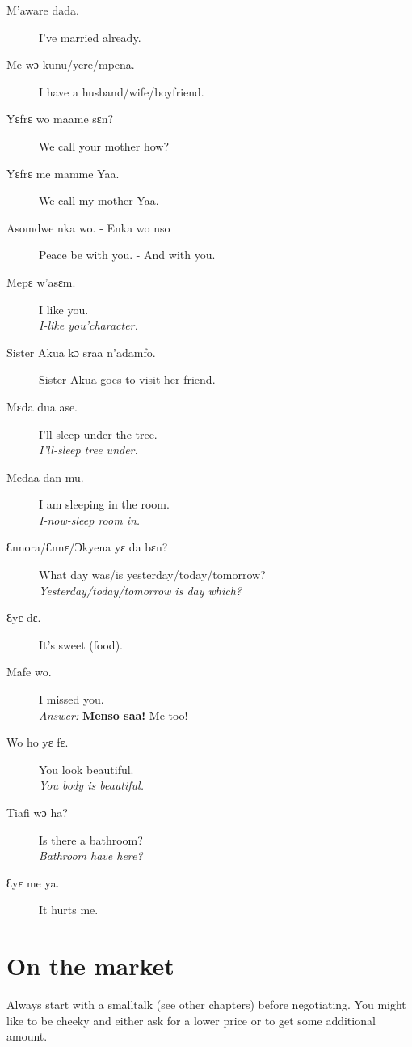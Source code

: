 \documentclass[%
 fontsize=11pt,%
 a5paper,pagesize,
 paper=a5,%
 DIV=9,%
 parskip=half*,%
 twoside=true,
 pointlessnumbers
]{scrbook}%
\begin{document}
\begin{description}
  \item[M'aware dada.] I've married already.
  \item[Me wɔ kunu/yere/mpena.] I have a husband/wife/boyfriend.
  \item[Yɛfrɛ wo maame sɛn?] We call your mother how?
  \item[Yɛfrɛ me mamme Yaa.] We call my mother Yaa.
  \item[Asomdwe nka wo. - Enka wo nso] Peace be with you. - And with you.
  \item[Mepɛ w'asɛm.] I like you. \\
    \textit{I-like you'character.}
  \item[Sister Akua kɔ sraa n'adamfo.] Sister Akua goes to visit her friend.
  \item[Mɛda dua ase.] I'll sleep under the tree. \\
    \textit{I'll-sleep tree under.}
  \item[Medaa dan mu.] I am sleeping in the room. \\
    \textit{I-now-sleep room in.}
  \item[Ɛnnora/Ɛnnɛ/Ɔkyena yɛ da bɛn?] What day was/is yesterday/today/tomorrow? \\
    \textit{Yesterday/today/tomorrow is day which?}
  \item[Ɛyɛ dɛ.] It's sweet (food).
  \item[Mafe wo.] I missed you. \\
    \textit{Answer:} \textbf{Menso saa!} Me too!
  \item[Wo ho yɛ fɛ.] You look beautiful. \\
    \textit{You body is beautiful.}
  \item[Tiafi wɔ ha?] Is there a bathroom? \\
    \textit{Bathroom have here?}
  \item[Ɛyɛ me ya.] It hurts me.
\end{description}


\chapter{On the market}

Always start with a smalltalk (see other chapters) before negotiating. You might like to be cheeky and either ask for a lower price or to get some additional amount.
\end{document}
